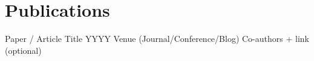 
\section{Publications}

\resumeSubHeadingListStart
    \resumeSubheading
        {Paper / Article Title}
        {YYYY}
        {Venue (Journal/Conference/Blog)}
        {Co-authors + link (optional)}
\resumeSubHeadingListEnd
